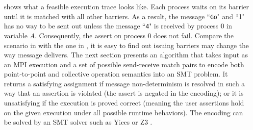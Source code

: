  shows what a feasible execution trace looks like. Each process waits on its barrier until it is matched with all other barriers. As a result, the message ``\texttt{Go}" and ``1" has no way to be sent out unless the message ``\texttt{4}" is received by process $0$ in variable $A$. Consequently, the assert on process $0$ does not fail. Compare the scenario in  with the one in , it is easy to find out issuing barriers may change the way message delivers. The next section presents an algorithm that takes input as an MPI execution and a set of possible send-receive match pairs to encode both point-to-point and collective operation semantics into an SMT problem. It returns a satisfying assignment if message non-determinism is resolved in such a way that an assertion is violated (the assert is negated in the encoding); or it is unsatisfying if the execution is proved correct (meaning the user assertions hold on the given execution under all possible runtime behaviors). The encoding can be solved by an SMT solver such as Yices \cite{} or Z3 \cite{}.







